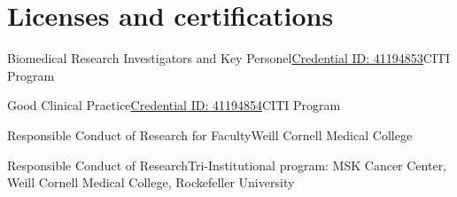 \documentclass[11pt,a4paper,roman]{moderncv} %
\begin{document}

\section{Licenses and certifications}

        {Biomedical Research Investigators and Key Personel}{\href{https://www.citiprogram.org/verify/?w9102e99f-9a51-41fc-993b-e50ba7dafc36-41194853}{Credential ID: 41194853}}{}{}{CITI Program}

        {Good Clinical Practice}{\href{https://www.citiprogram.org/verify/?w50fab502-7953-4e4c-ac09-87d4aa204f2f-41194854}{Credential ID: 41194854}}{}{}{CITI Program}

        {Responsible Conduct of Research for Faculty}{}{}{}{Weill Cornell Medical College}

        {Responsible Conduct of Research}{}{}{}{Tri-Institutional program: MSK Cancer Center, Weill Cornell Medical College, Rockefeller University}


\end{document}
